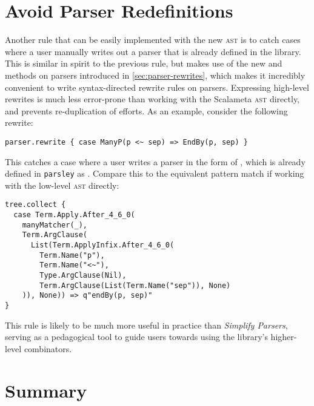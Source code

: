 \documentclass[../../main.tex]{subfiles}
\begin{document}
\section{Avoid Parser Redefinitions}
Another rule that can be easily implemented with the new  \textsc{ast} is to catch cases where a user manually writes out a parser that is already defined in the library.
This is similar in spirit to the previous rule, but makes use of the new  and  methods on parsers introduced in \cref{sec:parser-rewrites}, which makes it incredibly convenient to write syntax-directed rewrite rules on parsers.
Expressing high-level rewrites is much less error-prone than working with the Scalameta \textsc{ast} directly, and prevents re-duplication of efforts.
As an example, consider the following rewrite:
\begin{verbatim}
parser.rewrite { case ManyP(p <~ sep) => EndBy(p, sep) }
\end{verbatim}
%
This catches a case where a user writes a parser in the form of , which is already defined in \texttt{parsley} as .
Compare this to the equivalent pattern match if working with the low-level \textsc{ast} directly:
\begin{verbatim}
tree.collect {
  case Term.Apply.After_4_6_0(
    manyMatcher(_),
    Term.ArgClause(
      List(Term.ApplyInfix.After_4_6_0(
        Term.Name("p"),
        Term.Name("<~"),
        Type.ArgClause(Nil),
        Term.ArgClause(List(Term.Name("sep")), None)
    )), None)) => q"endBy(p, sep)"
}
\end{verbatim}
%
This rule is likely to be much more useful in practice than \emph{Simplify Parsers}, serving as a pedagogical tool to guide users towards using the library's higher-level combinators.



\section*{Summary}
\end{document}
